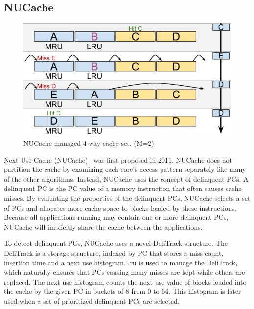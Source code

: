 
\subsection{NUCache}
\label{sec:algorithms:nucache}

\begin{figure}[ht]
    \centering
    \includegraphics[width=.65\textwidth]{figures/algorithms/NUCache}
    \caption[NUCache managed 4-way cache set.]{NUCache managed 4-way cache set. (M=2)}
    \label{fig:algorithms:nucache_example}
\end{figure}

Next Use Cache (NUCache)~\cite{Manikantan2011} was first proposed in 2011.
NUCache does not partition the cache by examining each core's access pattern separately like many of the other algorithms. 
Instead, NUCache uses the concept of delinquent PCs.
A delinquent PC is the PC value of a memory instruction that often causes cache misses.
By evaluating the properties of the delinquent PCs, NUCache selects a set of PCs and allocates more cache space to blocks loaded by these instructions.
Because all applications running may contain one or more delinquent PCs, NUCache will implicitly share the cache between the applications.

To detect delinquent PCs, NUCache uses a novel DeliTrack structure.
The DeliTrack is a storage structure, indexed by PC that stores a miss count, insertion time and a next use histogram. 
\gls{lru} is used to manage the DeliTrack, which naturally ensures that PCs causing many misses are kept while others are replaced.
The next use histogram counts the next use value of blocks loaded into the cache by the given PC in buckets of 8 from 0 to 64.
This histogram is later used when a set of prioritized delinquent PCs are selected.

